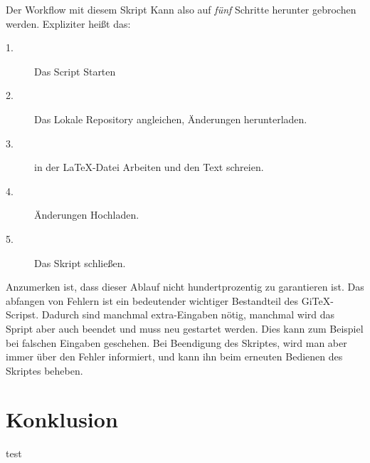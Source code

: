 \documentclass[12pt,a4paper]{scrartcl}
\begin{document}
Der Workflow mit diesem Skript Kann also auf \emph{fünf} Schritte herunter gebrochen werden. Expliziter heißt das:
\begin{description}
\item[1.] Das Script Starten
\item[2.] Das Lokale Repository angleichen, Änderungen herunterladen.
\item[3.] in der \LaTeX -Datei Arbeiten und den Text schreien.
\item[4.] Änderungen Hochladen.
\item[5.] Das Skript schließen.
\end{description}

Anzumerken ist, dass dieser Ablauf nicht hundertprozentig zu garantieren ist. Das abfangen von Fehlern ist ein bedeutender wichtiger Bestandteil des GiTeX-Scripst. Dadurch sind manchmal extra-Eingaben nötig, manchmal wird das Spript aber auch beendet und muss neu gestartet werden. Dies kann zum Beispiel bei falschen Eingaben geschehen. Bei Beendigung des Skriptes, wird man aber immer über den Fehler informiert, und kann ihn beim erneuten Bedienen des Skriptes beheben.

\section{Konklusion}

test
\end{document}
